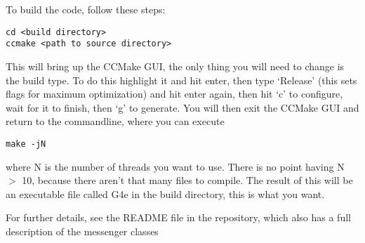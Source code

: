 \documentclass{article}
\begin{document}
To build the code, follow these steps:
\begin{verbatim}
cd <build directory>
ccmake <path to source directory>
\end{verbatim}
This will bring up the CCMake GUI, the only thing you will need to change is the build type. To do this highlight it and hit enter, then type `Release' (this sets flags for maximum optimization) and hit enter again, then hit `c' to configure, wait for it to finish, then `g' to generate. You will then exit the CCMake GUI and return to the commandline, where you can execute
\begin{verbatim}
make -jN
\end{verbatim}
where N is the number of threads you want to use. There is no point having N $>$ 10, because there aren't that many files to compile. The result of this will be an executable file called G4e in the build directory, this is what you want.

For further details, see the README file in the repository, which also has a full description of the messenger classes
\end{document}
